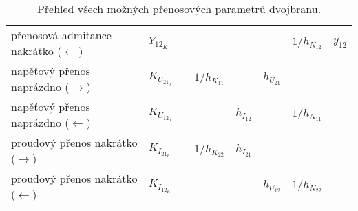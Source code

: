 \begin{table*}[!t]
\begin{tabular}{|l|l|l|l|l|l|l|l|}
          přenosová admitance nakrátko (\(\leftarrow\))
           & \(Y_{12_K}\) 
                 & & & & & \(1/h_{N_{12}}\) & \(y_{12}\)     \\
          napěťový přenos naprázdno (\(\rightarrow\))
           & \(K_{U_{21_0}}\) 
                 & & \(1/h_{K_{11}}\) & & \(h_{U_{21}}\) & & \\
          napěťový přenos naprázdno (\(\leftarrow\))
           & \(K_{U_{12_0}}\) 
                 & & & \(h_{I_{12}}\) & & \(1/h_{N_{11}}\) & \\
          proudový přenos nakrátko (\(\rightarrow\))
           & \(K_{I_{21_K}}\) 
                 & & \(1/h_{K_{22}}\) & \(h_{I_{21}}\) & & & \\
          proudový přenos nakrátko (\(\leftarrow\))
           & \(K_{I_{12_K}}\) 
                 & & & & \(h_{U_{12}}\) & \(1/h_{N_{22}}\) & \\
          \hline
        \end{tabular}
        \caption{Přehled všech možných přenosových parametrů dvojbranu.}
        \label{ES:tab_topol01}
      \end{table*}

        

